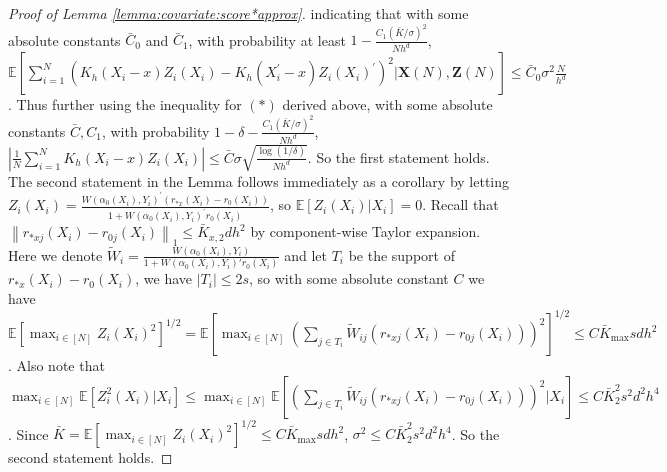 \documentclass[11pt]{article}
\begin{document}
\begin{proof}[Proof of Lemma \ref{lemma:covariate:score*approx}]
indicating that with some absolute constants $\bar{C}_0$ and $\bar{C}_1$, with probability at least $\displaystyle1-\frac{C_1(\bar{K}/\sigma)^2}{Nh^d}$, $\displaystyle\mathbb{E}\left[\sum_{i=1}^N\left(K_h(X_i-x)Z_i(X_i)-K_h(X_i^\prime-x)Z_i(X_i)^\prime\right)^2\big|\mathbf{X}(N),\mathbf{Z}(N)\right]\leq\bar{C}_0\sigma^2\frac{N}{h^d}$. Thus further using the inequality for $(*)$ derived above, with some absolute constants $\bar{C},C_1$, with probability $1-\delta-\frac{C_1(\bar{K}/\sigma)^2}{Nh^d}$, $\displaystyle\left|\frac{1}{N}\sum_{i=1}^N K_h(X_i-x) Z_i(X_i) \right|\leq\bar{C}\sigma\sqrt{\frac{\log(1/\delta)}{Nh^d}}$. So the first statement holds. The second statement in the Lemma follows immediately as a corollary by letting $\displaystyle Z_i(X_i)=\frac{ W(\alpha_0(X_i),Y_i)^\prime(r_{*x}(X_i)-r_0(X_i))}{1+W(\alpha_0(X_i),Y_i)^\prime r_0(X_i)}$, so $\mathbb{E}[Z_i(X_i)|X_i]=0$. Recall that $\left\|  r_{*xj}(X_i)-r_{0j}(X_i) \right\|_1 \leq \bar{K}_{x,2}dh^2$ by component-wise Taylor expansion. Here we denote $\displaystyle\widetilde{W}_i=\frac{W(\alpha_0(X_i),Y_i)}{1+W(\alpha_0(X_i),Y_i)'r_0(X_i)}$ and let $T_i$ be the support of $r_{*x}(X_i)-r_0(X_i)$, we have $|T_i|\leq 2s$, so with some absolute constant $C$ we have $\mathbb{E}[\max_{i\in[N]}Z_i(X_i)^2]^{1/2}=\mathbb{E}\left[\max_{i\in[N]}\left(\sum_{j\in T_i}\widetilde{W}_{ij}(r_{*xj}(X_i)-r_{0j}(X_i))\right)^2\right]^{1/2}\!\!\!\!\!\!\!\!\leq C\bar{K}_{\max}sdh^2$. Also note that $\max_{i\in[N]}\mathbb{E}[Z_i^2(X_i)|X_i]\leq \max_{i\in[N]}\mathbb{E}\left[\left(\sum_{j\in T_i}\widetilde{W}_{ij}(r_{*xj}(X_i)-r_{0j}(X_i))\right)^2\big|X_i\right]\leq C\bar{K}_{2}^2s^2d^2h^4$. Since $\bar{K}=\mathbb{E}[{\displaystyle\max_{i\in[N]}}Z_i(X_i)^2]^{1/2}\leq C\bar{K}_{\max}sdh^2$, $\sigma^2\leq C\bar{K}_2^2s^2d^2h^4$. So the second statement holds.
\end{proof}
\end{document}
